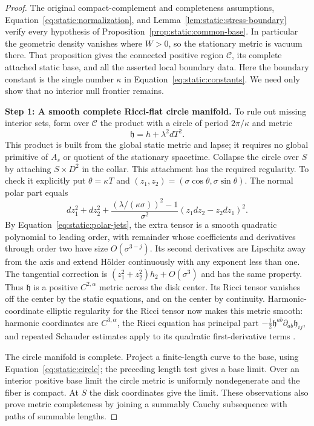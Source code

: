 \begin{proof}
The original compact-complement and completeness assumptions,
Equation~\eqref{eq:static:normalization}, and
Lemma~\ref{lem:static:stress-boundary} verify every hypothesis of
Proposition~\ref{prop:static:common-base}.  In particular the
geometric density vanishes where $W>0$, so the stationary metric
is vacuum there.  That proposition gives the connected positive
region $\mathcal C$, its complete attached static base, and all
the asserted local boundary data.  Here the boundary constant is
the single number $\kappa$ in Equation~\eqref{eq:static:constants}.
We need only show that no interior null frontier remains.

\smallskip\noindent
\textbf{Step 1: A smooth complete Ricci-flat circle manifold.}
To rule out missing interior sets, form over $\mathcal C$ the
product with a circle of period $2\pi/\kappa$ and metric
\begin{equation}\label{eq:static:circle}
 \mathfrak h=h+\lambda^2dT^2.
\end{equation}
This product is built from the global static metric and lapse;
it requires no global primitive of $A_s$ or quotient of the
stationary spacetime.
Collapse the circle over $S$ by attaching $S\times D^2$ in
the collar.  This attachment has the required regularity.
To check it explicitly put $\theta=\kappa T$ and
$(z_1,z_2)=(\sigma\cos\theta,\sigma\sin\theta)$.
The normal polar part equals
\[
 dz_1^2+dz_2^2+
 \frac{(\lambda/(\kappa\sigma))^2-1}{\sigma^2}
       (z_1dz_2-z_2dz_1)^2.
\]
By Equation~\eqref{eq:static:polar-jets}, the extra tensor is a
smooth quadratic polynomial to leading order, with remainder
whose coefficients and derivatives through order two have size
$O(\sigma^{3-j})$.  Its second derivatives are Lipschitz away
from the axis and extend Hölder continuously with any exponent
less than one.  The tangential correction is
$(z_1^2+z_2^2)h_2+O(\sigma^3)$ and has the same property.
Thus $\mathfrak h$ is a positive $C^{2,\alpha}$ metric across
the disk center.  Its Ricci tensor vanishes off the center by
the static equations, and on the center by continuity.
Harmonic-coordinate elliptic regularity for the Ricci tensor
now makes this metric smooth: harmonic coordinates are
$C^{3,\alpha}$, the Ricci equation has principal part
$-\tfrac12\mathfrak h^{ab}\partial_{ab}\mathfrak h_{ij}$,
and repeated Schauder estimates apply to its quadratic
first-derivative terms \cite{DeTurckKazdan1981}.

The circle manifold is complete.  Project a finite-length curve
to the base, using Equation~\eqref{eq:static:circle}; the
preceding length test gives a base limit.  Over an interior
positive base limit the circle metric is uniformly
nondegenerate and the fiber is compact.  At $S$ the disk
coordinates give the limit.  These observations also prove
metric completeness by joining a summably Cauchy subsequence
with paths of summable lengths.


\end{proof}
